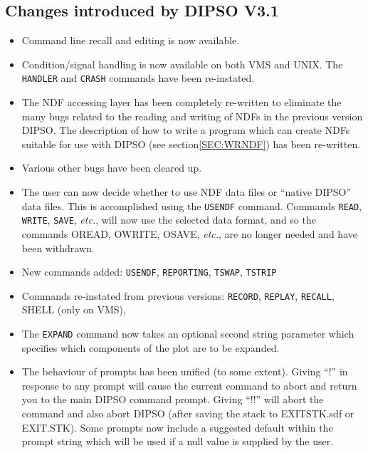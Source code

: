 \documentclass[twoside,11pt]{article}
\newcommand{\hyperref}[4]{#2\ref{#4}#3}
\newcommand{\htmlref}[2]{#1}
\renewcommand{\_}{\texttt{\symbol{95}}}
\begin{document}
\subsection{Changes introduced by DIPSO V3.1}
\begin{itemize}

\item Command line recall and editing is now available.

\item Condition/signal handling is now available on both VMS and UNIX.
The \htmlref{{\tt{HANDLER}}}{COM:HANDLER}  and \htmlref{{\tt{CRASH}}}{COM:CRASH}  commands have been re-instated.

\item The NDF accessing layer has been completely re-written to
eliminate the many bugs related to the reading and writing of NDFs in
the previous version DIPSO. The description of how to write a program
which can create NDFs suitable for use with DIPSO (see 
\hyperref{earlier}{section}{}{SEC:WRNDF}) has been re-written.

\item Various other bugs have been cleared up.

\item The user can now decide whether to use NDF data files or ``native
DIPSO'' data files. This is accomplished using the \htmlref{{\tt{USENDF}}}{COM:USENDF}  command.
Commands \htmlref{{\tt{READ}}}{COM:READ},  \htmlref{{\tt{WRITE}}}{COM:WRITE},  \htmlref{{\tt{SAVE}}}{COM:SAVE},  {\em etc.}, will now use the selected data
format, and so the commands OREAD, OWRITE, OSAVE, {\em etc.}, are no
longer needed and have been withdrawn.

\item New commands added: \htmlref{{\tt{USENDF}}}{COM:USENDF},  \htmlref{{\tt{REPORTING}}}{COM:REPORTING},  \htmlref{{\tt{TSWAP}}}{COM:TSWAP},  \htmlref{{\tt{TSTRIP}}}{COM:TSTRIP} 

\item Commands re-instated from previous versions: \htmlref{{\tt{RECORD}}}{COM:RECORD},  \htmlref{{\tt{REPLAY}}}{COM:REPLAY}, 
\htmlref{{\tt{RECALL}}}{COM:RECALL},  SHELL (only on VMS),

\item The \htmlref{{\tt{EXPAND}}}{COM:EXPAND}  command now takes an optional second string parameter
which specifies which components of the plot are to be expanded.

\item The behaviour of prompts has been unified (to some extent).
Giving ``!'' in response to any prompt will cause the current command to
abort and return you to the main DIPSO command prompt. Giving ``!!'' will
abort the command and also abort DIPSO (after saving the stack to
EXIT\_STK.sdf or EXIT.STK). Some prompts now include a suggested default
within the prompt string which will be used if a null value is supplied
by the user.


\end{itemize}
\end{document}
